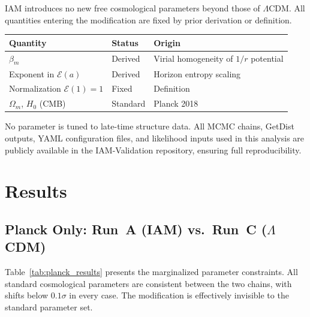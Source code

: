 \documentclass[11pt]{article}
\begin{document}
IAM introduces no new free cosmological parameters beyond those of $\Lambda$CDM.
All quantities entering the modification are fixed by prior derivation or definition.

\begin{center}
\begin{tabular}{lll}
\hline
Quantity & Status & Origin \\
\hline
$\beta_m$ & Derived & Virial homogeneity of $1/r$ potential \\
Exponent in $\mathcal{E}(a)$ & Derived & Horizon entropy scaling \\
Normalization $\mathcal{E}(1)=1$ & Fixed & Definition \\
$\Omega_m$, $H_0$ (CMB) & Standard & Planck 2018 \\
\hline
\end{tabular}
\end{center}

No parameter is tuned to late-time structure data. All MCMC chains,
GetDist outputs, YAML configuration files, and likelihood inputs used in
this analysis are publicly available in the IAM-Validation repository,
ensuring full reproducibility.

\section{Results}
\label{sec:results}

\subsection{Planck Only: Run~A (IAM) vs.\ Run~C ($\Lambda$CDM)}

Table~\ref{tab:planck_results} presents the marginalized parameter
constraints.  All standard cosmological parameters are consistent
between the two chains, with shifts below $0.1\sigma$ in every case.
The modification is effectively invisible to the standard parameter
set.
\end{document}
